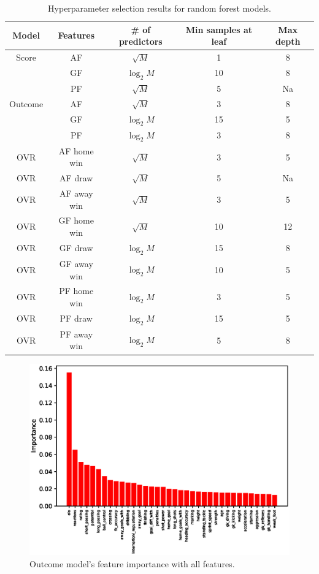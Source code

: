 \begin{table}
    \caption{Hyperparameter selection results for random forest models.}
    \begin{tabular}{| c  c| c| c| c|}
        \hline
        Model & Features & \# of predictors & Min samples at leaf & Max depth\\
        \hline
        Score & AF & $\sqrt{M}$ & 1 & 8 \\
         & GF & $\log_2{M}$ & 10 & 8 \\
         & PF & $\sqrt{M}$ & 5 & Na \\
         \hline
        Outcome & AF & $\sqrt{M}$ & 3 & 8 \\
         & GF & $\log_2{M}$ & 15 & 5 \\
         & PF & $\log_2{M}$ & 3 & 8 \\
        \hline
        OVR & AF home win & $\sqrt{M}$ & 3 & 5 \\
        OVR & AF draw & $\sqrt{M}$ & 5 & Na \\
        OVR & AF away win & $\sqrt{M}$ & 3 & 5 \\
        OVR & GF home win & $\sqrt{M}$ & 10 & 12 \\
        OVR & GF draw & $\log_2{M}$ & 15 & 8 \\
        OVR & GF away win & $\log_2{M}$ & 10 & 5 \\
        OVR & PF home win & $\log_2{M}$ & 3 & 5 \\
        OVR & PF draw & $\log_2{M}$ & 15 & 5 \\
        OVR & PF away win & $\log_2{M}$ & 5 & 8 \\
        \hline
    \end{tabular}
    \label{table:hyperparam_results}
\end{table}

\begin{figure}[H]
    \centering
    \includegraphics[width=1\textwidth]{img/match_level_2018_outcome_feature_importance_af_feature_importance.eps}
    \caption{Outcome model's feature importance with all features.}
    \label{fig:outcome_feature_importance_af}
\end{figure}

